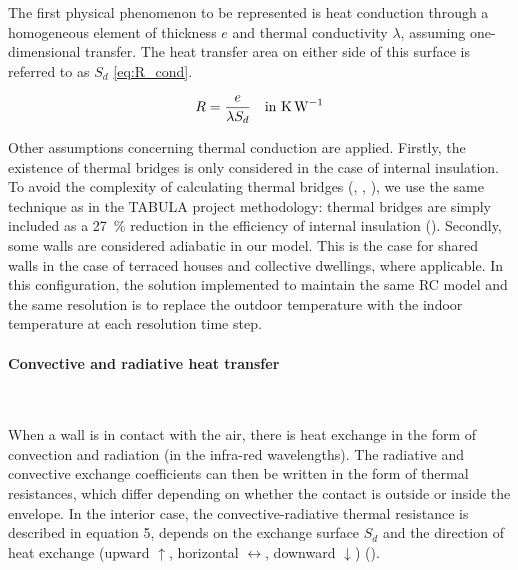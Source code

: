 \documentclass[11pt]{article}
\begin{document}
            The first physical phenomenon to be represented is heat conduction through a homogeneous element of thickness $e$ and thermal conductivity $\lambda$, assuming one-dimensional transfer. The heat transfer area on either side of this surface is referred to as $S_d$ \eqref{eq:R_cond}.

            \begin{equation}\label{eq:R_cond}
                R = \frac{e}{\lambda S_d} \quad \text{in \SI{}{\kelvin\per\watt}}
            \end{equation}

            Other assumptions concerning thermal conduction are applied. Firstly, the existence of thermal bridges is only considered in the case of internal insulation. To avoid the complexity of calculating thermal bridges (\cite{mao_dynamic_1997}, \cite{martin_problems_2011}, \cite{ministere_de_la_transition_ecologique_regles_2017-1}), we use the same technique as in the TABULA project methodology: thermal bridges are simply included as a \SI{27}{\percent} reduction in the efficiency of internal insulation (\cite{pouget_consultants_batiments_2015}). Secondly, some walls are considered adiabatic in our model. This is the case for shared walls in the case of terraced houses and collective dwellings, where applicable. In this configuration, the solution implemented to maintain the same RC model and the same resolution is to replace the outdoor temperature with the indoor temperature at each resolution time step. 


            \paragraph{Convective and radiative heat transfer}\mbox{}\\ %
            \label{par:convective_and_radiative_heat_transfer}

            When a wall is in contact with the air, there is heat exchange in the form of convection and radiation (in the infra-red wavelengths). The radiative and convective exchange coefficients can then be written in the form of thermal resistances, which differ depending on whether the contact is outside or inside the envelope. In the interior case, the convective-radiative thermal resistance is described in equation 5, depends on the exchange surface $S_d$ and the direction of heat exchange (upward $\uparrow$, horizontal $\leftrightarrow$, downward $\downarrow$) (\cite{ministere_de_la_transition_ecologique_regles_2017-2}). 
\end{document}
